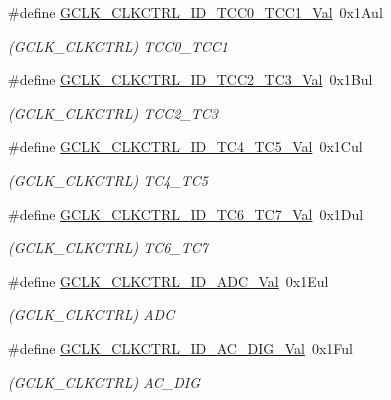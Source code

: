 \begin{DoxyCompactItemize}
\#define \mbox{\hyperlink{group___s_a_m_d21___g_c_l_k_ga186870cd8d31d127b17008e778ab1599}{G\+C\+L\+K\+\_\+\+C\+L\+K\+C\+T\+R\+L\+\_\+\+I\+D\+\_\+\+T\+C\+C0\+\_\+\+T\+C\+C1\+\_\+\+Val}}~0x1\+Aul
\begin{DoxyCompactList}\small\item\em (G\+C\+L\+K\+\_\+\+C\+L\+K\+C\+T\+RL) T\+C\+C0\+\_\+\+T\+C\+C1 \end{DoxyCompactList}\item 
\#define \mbox{\hyperlink{group___s_a_m_d21___g_c_l_k_ga855fa017d163420dc1a347eb24876d65}{G\+C\+L\+K\+\_\+\+C\+L\+K\+C\+T\+R\+L\+\_\+\+I\+D\+\_\+\+T\+C\+C2\+\_\+\+T\+C3\+\_\+\+Val}}~0x1\+Bul
\begin{DoxyCompactList}\small\item\em (G\+C\+L\+K\+\_\+\+C\+L\+K\+C\+T\+RL) T\+C\+C2\+\_\+\+T\+C3 \end{DoxyCompactList}\item 
\#define \mbox{\hyperlink{group___s_a_m_d21___g_c_l_k_ga6e2e800404f3b2e6948ced5f489aa557}{G\+C\+L\+K\+\_\+\+C\+L\+K\+C\+T\+R\+L\+\_\+\+I\+D\+\_\+\+T\+C4\+\_\+\+T\+C5\+\_\+\+Val}}~0x1\+Cul
\begin{DoxyCompactList}\small\item\em (G\+C\+L\+K\+\_\+\+C\+L\+K\+C\+T\+RL) T\+C4\+\_\+\+T\+C5 \end{DoxyCompactList}\item 
\#define \mbox{\hyperlink{group___s_a_m_d21___g_c_l_k_ga540d3e213ae8c696000670dbc1ea3721}{G\+C\+L\+K\+\_\+\+C\+L\+K\+C\+T\+R\+L\+\_\+\+I\+D\+\_\+\+T\+C6\+\_\+\+T\+C7\+\_\+\+Val}}~0x1\+Dul
\begin{DoxyCompactList}\small\item\em (G\+C\+L\+K\+\_\+\+C\+L\+K\+C\+T\+RL) T\+C6\+\_\+\+T\+C7 \end{DoxyCompactList}\item 
\#define \mbox{\hyperlink{group___s_a_m_d21___g_c_l_k_gafa044a1103ba6b6a8bc6d7f7d44c4cea}{G\+C\+L\+K\+\_\+\+C\+L\+K\+C\+T\+R\+L\+\_\+\+I\+D\+\_\+\+A\+D\+C\+\_\+\+Val}}~0x1\+Eul
\begin{DoxyCompactList}\small\item\em (G\+C\+L\+K\+\_\+\+C\+L\+K\+C\+T\+RL) A\+DC \end{DoxyCompactList}\item 
\#define \mbox{\hyperlink{group___s_a_m_d21___g_c_l_k_ga4f314ff01d05a73788706a3e0cf98363}{G\+C\+L\+K\+\_\+\+C\+L\+K\+C\+T\+R\+L\+\_\+\+I\+D\+\_\+\+A\+C\+\_\+\+D\+I\+G\+\_\+\+Val}}~0x1\+Ful
\begin{DoxyCompactList}\small\item\em (G\+C\+L\+K\+\_\+\+C\+L\+K\+C\+T\+RL) A\+C\+\_\+\+D\+IG \end{DoxyCompactList}\item 

\end{DoxyCompactItemize}
